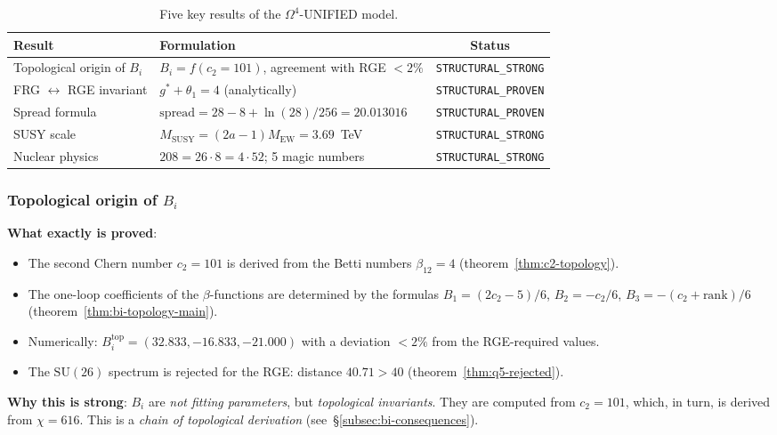 \documentclass[11pt,a4paper]{article}
\newcommand{\SU}{\ensuremath{\mathrm{SU}}}
\newcommand{\Om}{\ensuremath{\Omega^4}}
\theoremstyle{definition}
\begin{document}
\begin{table}[ht]
\centering
\caption{Five key results of the \texorpdfstring{$\Om$}{}-UNIFIED model.}
\label{tab:key-results-disc}
\begin{tabular}{p{4.5cm}p{5.5cm}c}
\toprule
Result & Formulation & Status \\
\midrule
Topological origin of $B_i$
    & $B_i = f(c_2 = 101)$, agreement with RGE $< 2\%$
    & \texttt{STRUCTURAL\_STRONG} \\[0.3em]
FRG $\leftrightarrow$ RGE invariant
    & $g^* + \theta_1 = 4$ (analytically)
    & \texttt{STRUCTURAL\_PROVEN} \\[0.3em]
Spread formula
    & $\text{spread} = 28 - 8 + \ln(28)/256 = 20.013016$
    & \texttt{STRUCTURAL\_PROVEN} \\[0.3em]
SUSY scale
    & $M_{\text{SUSY}} = (2a-1) M_{\text{EW}} = 3.69$~TeV
    & \texttt{STRUCTURAL\_STRONG} \\[0.3em]
Nuclear physics
    & $208 = 26 \cdot 8 = 4 \cdot 52$; 5 magic numbers
    & \texttt{STRUCTURAL\_STRONG} \\
\bottomrule
\end{tabular}
\end{table}

\subsubsection{Topological origin of \texorpdfstring{$B_i$}{B\_i}}

\textbf{What exactly is proved}:
\begin{itemize}
    \item The second Chern number $c_2 = 101$ is derived from the Betti
          numbers $\beta_{12} = 4$ (theorem~\ref{thm:c2-topology}).
    \item The one-loop coefficients of the $\beta$-functions are determined
          by the formulas $B_1 = (2c_2-5)/6$, $B_2 = -c_2/6$,
          $B_3 = -(c_2 + \text{rank})/6$ (theorem~\ref{thm:bi-topology-main}).
    \item Numerically: $B_i^{\text{top}} = (32.833, -16.833, -21.000)$
          with a deviation $< 2\%$ from the RGE-required values.
    \item The $\SU(26)$ spectrum is rejected for the RGE:
          distance $40.71 > 40$ (theorem~\ref{thm:q5-rejected}).
\end{itemize}

\medskip\noindent
\textbf{Why this is strong}: $B_i$ are \emph{not fitting
parameters}, but \emph{topological invariants}. They are computed
from $c_2 = 101$, which, in turn, is derived from
$\chi = 616$. This is a \emph{chain of topological derivation}
(see~\S\ref{subsec:bi-consequences}).
\end{document}
